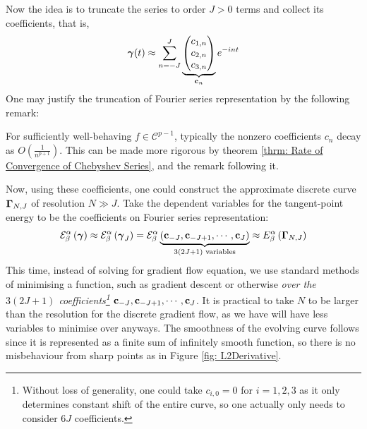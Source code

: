 \documentclass[../dissertation.tex]{subfiles}
\begin{document}
Now the idea is to truncate the series to order $J > 0$ terms and collect its coefficients,
that is,
\begin{equation*}
    \boldsymbol{\gamma}(t) \approx \sum_{n=-J}^{J}
    \underbrace{
    \begin{pmatrix}
        c_{1,n} \\
        c_{2,n} \\
        c_{3,n}
    \end{pmatrix}
}_{\mathbf{c}_n}
    e^{-int}
\end{equation*}
One may justify the truncation of Fourier series representation by the following remark:
\begin{remark}
    For sufficiently well-behaving $f \in \mathcal{C}^{p-1}$, typically the nonzero coefficients $c_n$ decay as $O\left( \frac{1}{n^{p+1}} \right)$.
    This can be made more rigorous by theorem \ref{thrm: Rate of Convergence of Chebyshev Series},
    and the remark following it.
\end{remark}
Now, using these coefficients, one could construct the approximate discrete curve $\boldsymbol{\Gamma}_{N,J}$ of resolution $N \gg J$.
Take the dependent variables for the tangent-point energy to be the coefficients on Fourier series representation:
\begin{equation}
    \mathcal{E}_{\beta}^{\alpha} \left( \boldsymbol{\gamma} \right)
    \approx
    \mathcal{E}_{\beta}^{\alpha} \left( \boldsymbol{\gamma}_{J} \right)
    =
    \mathcal{E}_{\beta}^{\alpha} \underbrace{\left( \mathbf{c}_{-J}, \mathbf{c}_{-J+1}, \cdots, \mathbf{c}_{J} \right)}_{3\left( 2J+1 \right) \text{ variables}}
    \approx
    E_{\beta}^{\alpha} \left( \boldsymbol{\Gamma}_{N,J} \right)
\end{equation}
This time, instead of solving for gradient flow equation,
we use standard methods of minimising a function, such as gradient descent or otherwise \textit{over the $3(2J+1)$ coefficients\footnote{Without loss of generality, one could take $c_{i,0} = 0$ for $i=1,2,3$ as it only determines constant shift of the entire curve, so one actually only needs to consider $6J$ coefficients.}} $\mathbf{c}_{-J}, \mathbf{c}_{-J+1}, \cdots, \mathbf{c}_{J}$.
It is practical to take $N$ to be larger than the resolution for the discrete gradient flow,
as we have will have less variables to minimise over anyways.
The smoothness of the evolving curve follows since it is represented as a finite sum of infinitely smooth function,
so there is no misbehaviour from sharp points as in Figure \ref{fig: L2Derivative}.
\end{document}

